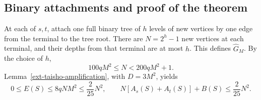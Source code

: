 \documentclass[11pt,a4paper]{article}
\theoremstyle{definition}\newtheorem{definition}[theorem]{Definition}
\theoremstyle{remark}\newtheorem{remark}[theorem]{Remark}
\numberwithin{equation}{section}
\begin{document}
\subsection{Binary attachments and proof of the theorem}

At each of $s,t$, attach one full binary tree of $h$ levels of new vertices by
one edge from the terminal to the tree root.  There are $N=2^h-1$ new vertices
at each terminal, and their depths from that terminal are at most $h$.
This defines $\widehat G_M$.  By the choice of $h$,
\[
 100qM^2\le N<200qM^2+1.
\]
Lemma~\ref{ext-taisho-amplification}, with $D=3M^2$, yields
\begin{equation}
\label{ext-taisho-remainder}
 0\le E(S)\le8qNM^2\le\frac{2}{25}N^2,
 \qquad N[A_s(S)+A_t(S)]+B(S)\le\frac{2}{25}N^2.
\end{equation}
\end{document}
